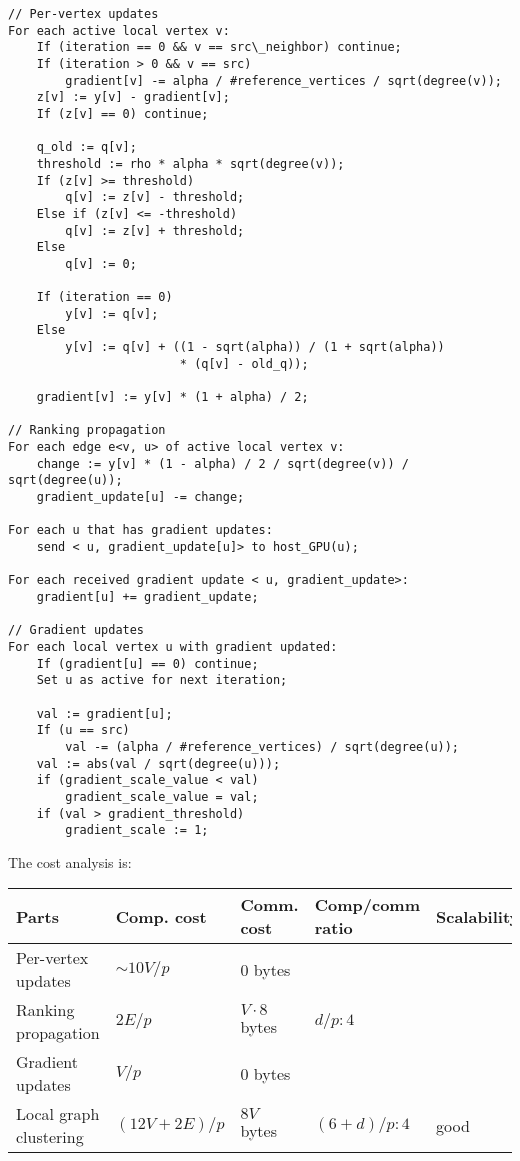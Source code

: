 \documentclass[10pt,oneside]{memoir}
\begin{document}
\begin{verbatim}
// Per-vertex updates
For each active local vertex v:
    If (iteration == 0 && v == src\_neighbor) continue;
    If (iteration > 0 && v == src)
        gradient[v] -= alpha / #reference_vertices / sqrt(degree(v));
    z[v] := y[v] - gradient[v];
    If (z[v] == 0) continue;

    q_old := q[v];
    threshold := rho * alpha * sqrt(degree(v));
    If (z[v] >= threshold)
        q[v] := z[v] - threshold;
    Else if (z[v] <= -threshold)
        q[v] := z[v] + threshold;
    Else
        q[v] := 0;

    If (iteration == 0)
        y[v] := q[v];
    Else
        y[v] := q[v] + ((1 - sqrt(alpha)) / (1 + sqrt(alpha))
                        * (q[v] - old_q));

    gradient[v] := y[v] * (1 + alpha) / 2;

// Ranking propagation
For each edge e<v, u> of active local vertex v:
    change := y[v] * (1 - alpha) / 2 / sqrt(degree(v)) / sqrt(degree(u));
    gradient_update[u] -= change;

For each u that has gradient updates:
    send < u, gradient_update[u]> to host_GPU(u);

For each received gradient update < u, gradient_update>:
    gradient[u] += gradient_update;

// Gradient updates
For each local vertex u with gradient updated:
    If (gradient[u] == 0) continue;
    Set u as active for next iteration;

    val := gradient[u];
    If (u == src)
        val -= (alpha / #reference_vertices) / sqrt(degree(u));
    val := abs(val / sqrt(degree(u)));
    if (gradient_scale_value < val)
        gradient_scale_value = val;
    if (val > gradient_threshold)
        gradient_scale := 1;
\end{verbatim}

The cost analysis is:

\begin{longtable}[]{@{}lllll@{}}
\toprule
Parts & Comp. cost & Comm. cost & Comp/comm ratio &
Scalability\tabularnewline
\midrule
\endhead
Per-vertex updates & \(\sim 10 V/p\) & \(0\) bytes & &\tabularnewline
Ranking propagation & \(2E/p\) & \(V \cdot 8\) bytes & \(d/p : 4\)
&\tabularnewline
Gradient updates & \(V/p\) & \(0\) bytes & &\tabularnewline
Local graph clustering & \((12V + 2E)/p\) & \(8V\) bytes &
\((6 + d)/p : 4\) & good\tabularnewline
\bottomrule
\end{longtable}
\end{document}
